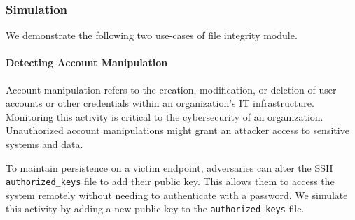 \subsubsection{Simulation}
We demonstrate the following two use-cases of file integrity module.
\paragraph{Detecting Account Manipulation}
Account manipulation refers to the creation, modification, or deletion of user accounts or other credentials within an organization's IT infrastructure. Monitoring this activity is critical to the cybersecurity of an organization. Unauthorized account manipulations might grant an attacker access to sensitive systems and data.

To maintain persistence on a victim endpoint, adversaries can alter the SSH \texttt{authorized\_keys} file to add their public key. This allows them to access the system remotely without needing to authenticate with a password. We simulate this activity by adding a new public key to the \texttt{authorized\_keys} file.

